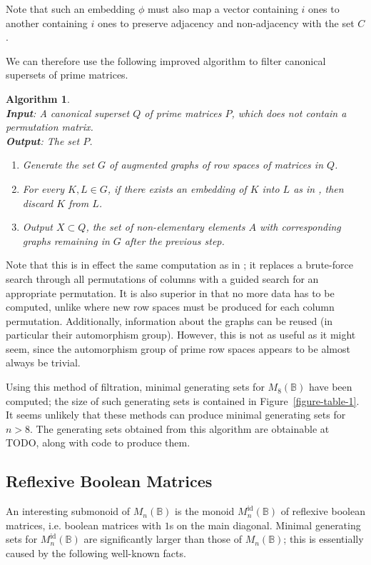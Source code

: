 \documentclass[11pt]{article}
\newtheorem{algo}[thm]{Algorithm}
\newenvironment{alg}{\begin{algo}\rm}{\end{algo}}
\numberwithin{equation}{section}
\newcommand{\B}{\mathbb{B}}
\newcommand{\Bn}{M_n(\B)}
\newcommand{\Bm}[1]{M_{#1}(\B)}
\newcommand{\Refn}{M_n^{\text{id}}(\B)}
\begin{document}
Note that such an embedding $\phi$ must also map a vector containing $i$ ones to
another containing $i$ ones to preserve adjacency and non-adjacency with the set
$C$.

We can therefore use the following improved algorithm to filter canonical
supersets of prime matrices.

\begin{alg}
  \ \\
  \textbf{Input}: A canonical superset $Q$ of prime matrices $P$, which does not
  contain a permutation matrix.\\
  \textbf{Output}: The set $P$.
  \begin{enumerate}
  \item
    Generate the set $G$ of augmented graphs of row spaces of matrices in $Q$.
  \item 
    For every $K, L \in G$, if there exists an embedding of $K$ into $L$ as in
    , then discard $K$ from $L$.
  \item
    Output $X\subset Q$, the set of non-elementary elements $A$ with
    corresponding graphs remaining in $G$ after the previous step.
\end{enumerate}
\end{alg}

Note that this is in effect the same computation as in ; it
replaces a brute-force search through all permutations of columns with a guided
search for an appropriate permutation. It is also superior in that no more data
has to be computed, unlike  where new row spaces must be
produced for each column permutation. Additionally, information about the graphs
can be reused (in particular their automorphism group). However, this is not as
useful as it might seem, since the automorphism group of prime row spaces
appears to be almost always be trivial.

Using this method of filtration, minimal generating sets for $\Bm{8}$ have been
computed; the size of such generating sets is contained in
Figure~\ref{figure-table-1}. It seems unlikely that these methods can produce
minimal generating sets for $n > 8$. The generating sets obtained from this
algorithm are obtainable at TODO, along with code to produce them.

\subsection{Reflexive Boolean Matrices}
An interesting submonoid of $\Bn$ is the monoid $\Refn$ of reflexive boolean
matrices, i.e. boolean matrices with $1$s on the main diagonal. Minimal
generating sets for $\Refn$ are significantly larger than those of $\Bn$; this
is essentially caused by the following well-known facts.
\end{document}
